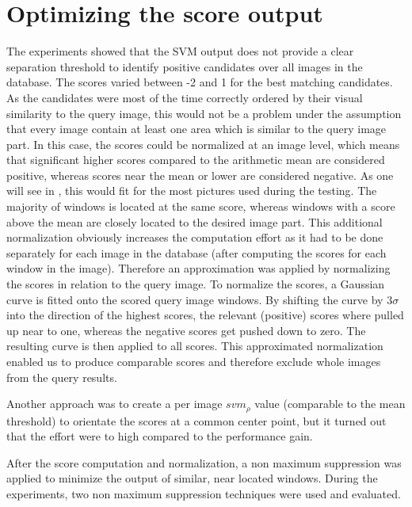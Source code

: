\section{Optimizing the score output}


The experiments showed that the \ac{SVM} output does not provide a clear separation threshold to identify positive candidates over all images in the database. The scores varied between -2 and 1 for the best matching candidates. As the candidates were most of the time correctly ordered by their visual similarity to the query image, this would not be a problem under the assumption that every image contain at least one area which is similar to the query image part. In this case, the scores could be normalized at an image level, which means that significant higher scores compared to the arithmetic mean are considered positive, whereas scores near the mean or lower are considered negative. %
As one will see in , this would fit for the most pictures used during the testing. The majority of windows is located at the same score, whereas windows with a score above the mean are closely located to the desired image part.
This additional normalization obviously increases the computation effort as it had to be done separately for each image in the database (after computing the scores for each window in the image). Therefore an approximation was applied by normalizing the scores in relation to the query image. To normalize the scores, a Gaussian curve is fitted onto the scored query image windows. By shifting the curve by $3\sigma$ into the direction of the highest scores, the relevant (positive) scores where pulled up near to one, whereas the negative scores get pushed down to zero. The resulting curve is then applied to all scores. This approximated normalization enabled us to produce comparable scores and therefore exclude whole images from the query results.

Another approach was to create a per image $svm_\rho$ value (comparable to the mean threshold) to orientate the scores at a common center point, but it turned out that the effort were to high compared to the performance gain.

After the score computation and normalization, a non maximum suppression was applied to minimize the output of similar, near located windows.
During the experiments, two non maximum suppression techniques were used and evaluated.

